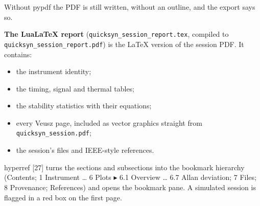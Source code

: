 \documentclass[
\directlua{luaotfload.add_fallback("qsfallback", {"DejaVu Sans:mode=harf;", "DejaVu Sans Mono:mode=harf;", "DejaVu Math TeX Gyre:mode=harf;"})}
  10pt,
  letterpaper,
]{article}
\providecommand{\tightlist}{%
  \setlength{\itemsep}{0pt}\setlength{\parskip}{0pt}}
\begin{document}
Without pypdf the PDF is still written, without an outline, and the
export says so.

\textbf{The LuaLaTeX report} (\texttt{quicksyn\_session\_report.tex},
compiled to \texttt{quicksyn\_session\_report.pdf}) is the LaTeX version
of the session PDF. It contains:

\begin{itemize}
\tightlist
\item
  the instrument identity;
\item
  the timing, signal and thermal tables;
\item
  the stability statistics with their equations;
\item
  every Veusz page, included as vector graphics straight from
  \texttt{quicksyn\_session.pdf};
\item
  the session's files and IEEE-style references.
\end{itemize}

hyperref {[}27{]} turns the sections and subsections into the bookmark
hierarchy (Contents; 1 Instrument \ldots{} 6 Plots ▸ 6.1 Overview
\ldots{} 6.7 Allan deviation; 7 Files; 8 Provenance; References) and
opens the bookmark pane. A simulated session is flagged in a red box on
the first page.
\end{document}
